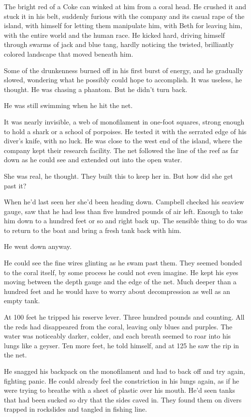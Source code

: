 The bright red of a Coke can winked at him from a coral head. He crushed it and stuck it in his belt, suddenly furious with the company and its casual rape of the island, with himself for letting them manipulate him, with Beth for leaving him, with the entire world and the human race. He kicked hard, driving himself through swarms of jack and blue tang, hardly noticing the twisted, brilliantly colored landscape that moved beneath him.

Some of the drunkenness burned off in his first burst of energy, and he gradually slowed, wondering what he possibly could hope to accomplish. It was useless, he thought. He was chasing a phantom. But he didn't turn back.

He was still swimming when he hit the net.

It was nearly invisible, a web of monofilament in one-foot squares, strong enough to hold a shark or a school of porpoises. He tested it with the serrated edge of his diver's knife, with no luck. He was close to the west end of the island, where the company kept their research facility. The net followed the line of the reef as far down as he could see and extended out into the open water.

She was real, he thought. They built this to keep her in. But how did she get past it?

When he'd last seen her she'd been heading down. Campbell checked his seaview gauge, saw that he had less than five hundred pounds of air left. Enough to take him down to a hundred feet or so and right back up. The sensible thing to do was to return to the boat and bring a fresh tank back with him.

He went down anyway.

He could see the fine wires glinting as he swam past them. They seemed bonded to the coral itself, by some process he could not even imagine. He kept his eyes moving between the depth gauge and the edge of the net. Much deeper than a hundred feet and he would have to worry about decompression as well as an empty tank.

At 100 feet he tripped his reserve lever. Three hundred pounds and counting. All the reds had disappeared from the coral, leaving only blues and purples. The water was noticeably darker, colder, and each breath seemed to roar into his lungs like a geyser. Ten more feet, he told himself, and at 125 he saw the rip in the net.

He snagged his backpack on the monofilament and had to back off and try again, fighting panic. He could already feel the constriction in his lungs again, as if he were trying to breathe with a sheet of plastic over his mouth. He'd seen tanks that had been sucked so dry that the sides caved in. They found them on divers trapped in rockslides and tangled in fishing line.

